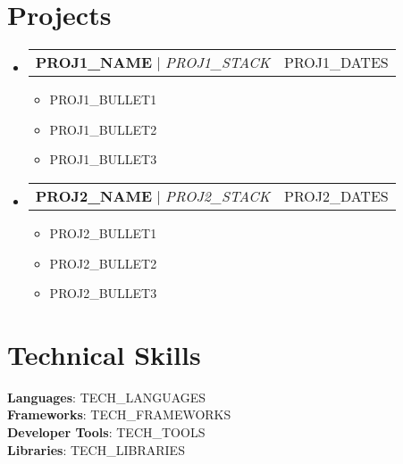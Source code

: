 \documentclass[letterpaper,11pt]{article}
\makeatletter
\newcommand{\resumeItem}[1]{
  \item\small{
    {#1 \vspace{-2pt}}
  }
}
\newcommand{\resumeProjectHeading}[2]{
  \item
  \begin{tabular*}{0.97\textwidth}{l@{\extracolsep{\fill}}r}
    \small #1 & #2 \\
  \end{tabular*}\vspace{-7pt}
}
\newcommand{\resumeSubHeadingListStart}{\begin{itemize}[leftmargin=0.15in, label={}]}
\newcommand{\resumeSubHeadingListEnd}{\end{itemize}}
\newcommand{\resumeItemListStart}{\begin{itemize}}
\newcommand{\resumeItemListEnd}{\end{itemize}\vspace{-5pt}}
\makeatother
\begin{document}
\section{Projects}
    \resumeSubHeadingListStart

      \resumeProjectHeading
          {\textbf{ {{PROJ1_NAME}} } $|$ \emph{ {{PROJ1_STACK}} }}{ {{PROJ1_DATES}} }
          \resumeItemListStart
            \resumeItem{ {{PROJ1_BULLET1}} }
            \resumeItem{ {{PROJ1_BULLET2}} }
            \resumeItem{ {{PROJ1_BULLET3}} }
          \resumeItemListEnd

      \resumeProjectHeading
          {\textbf{ {{PROJ2_NAME}} } $|$ \emph{ {{PROJ2_STACK}} }}{ {{PROJ2_DATES}} }
          \resumeItemListStart
            \resumeItem{ {{PROJ2_BULLET1}} }
            \resumeItem{ {{PROJ2_BULLET2}} }
            \resumeItem{ {{PROJ2_BULLET3}} }
          \resumeItemListEnd

    \resumeSubHeadingListEnd


\section{Technical Skills}
 \begin{itemize}[leftmargin=0.15in, label={}]
    \small{\item{
     \textbf{Languages}{: {{TECH_LANGUAGES}}} \\
     \textbf{Frameworks}{: {{TECH_FRAMEWORKS}}} \\
     \textbf{Developer Tools}{: {{TECH_TOOLS}}} \\
     \textbf{Libraries}{: {{TECH_LIBRARIES}}}
    }}
 \end{itemize}
\end{document}
